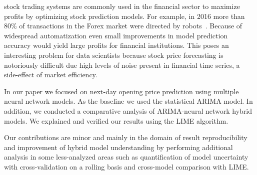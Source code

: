 \documentclass[12pt,journal,compsoc]{IEEEtran}
\begin{document}
% 
% 
% 
% 
 stock trading systems are commonly used in the financial sector to maximize profits by optimizing stock prediction models.
For example, in 2016 more than 80\% of transactions in the Forex market were directed by robots~\cite{intro-forex}.
Because of widespread automatization even small improvements in model prediction accuracy would yield large profits for financial institutions.
This poses an interesting problem for data scientists because stock price forecasting is notoriously difficult due high levels of noise present in financial time series, a side-effect of market efficiency.
\par In our paper we focused on next-day opening price prediction using multiple neural network models.
As the baseline we used the statistical ARIMA model.
In addition, we conducted a comparative analysis of ARIMA-neural network hybrid models.
We explained and verified our results using the LIME algorithm.
\par Our contributions are minor and mainly in the domain of result reproducibility and improvement of hybrid model understanding by performing additional analysis in some less-analyzed areas such as quantification of model uncertainty with cross-validation on a rolling basis and cross-model comparison with LIME.
\end{document}
